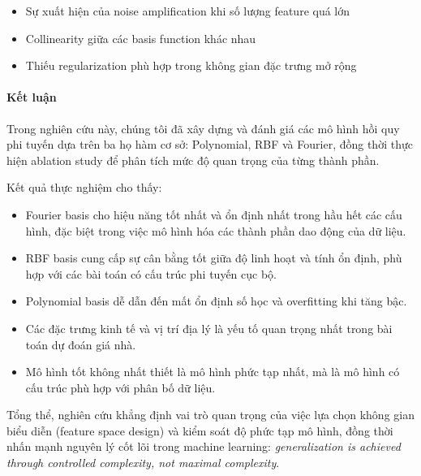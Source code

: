 \begin{itemize}
    \item Sự xuất hiện của noise amplification khi số lượng feature quá lớn
    \item Collinearity giữa các basis function khác nhau
    \item Thiếu regularization phù hợp trong không gian đặc trưng mở rộng
\end{itemize}

\paragraph{Kết luận}

Trong nghiên cứu này, chúng tôi đã xây dựng và đánh giá các mô hình hồi quy phi tuyến
dựa trên ba họ hàm cơ sở: Polynomial, RBF và Fourier, đồng thời thực hiện ablation study
để phân tích mức độ quan trọng của từng thành phần.

Kết quả thực nghiệm cho thấy:

\begin{itemize}
    \item Fourier basis cho hiệu năng tốt nhất và ổn định nhất trong hầu hết các cấu hình,
    đặc biệt trong việc mô hình hóa các thành phần dao động của dữ liệu.

    \item RBF basis cung cấp sự cân bằng tốt giữa độ linh hoạt và tính ổn định,
    phù hợp với các bài toán có cấu trúc phi tuyến cục bộ.

    \item Polynomial basis dễ dẫn đến mất ổn định số học và overfitting khi tăng bậc.

    \item Các đặc trưng kinh tế và vị trí địa lý là yếu tố quan trọng nhất
    trong bài toán dự đoán giá nhà.

    \item Mô hình tốt không nhất thiết là mô hình phức tạp nhất,
    mà là mô hình có cấu trúc phù hợp với phân bố dữ liệu.
\end{itemize}

Tổng thể, nghiên cứu khẳng định vai trò quan trọng của việc lựa chọn
không gian biểu diễn (feature space design) và kiểm soát độ phức tạp mô hình,
đồng thời nhấn mạnh nguyên lý cốt lõi trong machine learning:
\textit{generalization is achieved through controlled complexity, not maximal complexity}.
